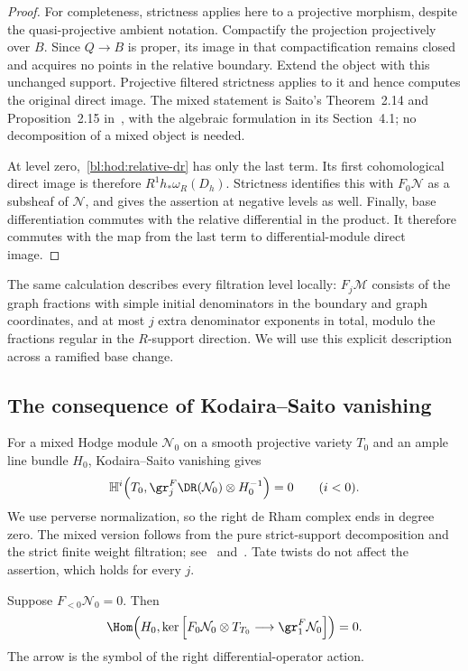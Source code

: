 \begin{proof}
For completeness, strictness applies here to a projective morphism,
despite the quasi-projective ambient notation. Compactify the
projection projectively over $B$. Since $Q\to B$ is proper, its
image in that compactification remains closed and acquires no
points in the relative boundary. Extend the object with this
unchanged support. Projective filtered strictness applies to it
and hence computes the original direct image. The mixed statement
is Saito's Theorem~2.14 and Proposition~2.15
in~\cite{Saito1990}, with the algebraic formulation in its
Section~4.1; no decomposition of a mixed object is needed.

At level zero,~\eqref{bl:hod:relative-dr} has only the last term.
Its first cohomological direct image is therefore
$R^1h_*\omega_R(D_h)$. Strictness identifies this with $F_0\mathcal N$
as a subsheaf of $\mathcal N$, and gives the assertion at negative
levels as well. Finally, base differentiation commutes with the
relative differential in the product. It therefore commutes with
the map from the last term to differential-module direct image.
\end{proof}

The same calculation describes every filtration level locally:
$F_j\mathcal M$ consists of the graph fractions with simple initial
denominators in the boundary and graph coordinates, and at most
$j$ extra denominator exponents in total, modulo the fractions
regular in the $R$-support direction. We will use this explicit
description across a ramified base change.

\subsection{The consequence of Kodaira--Saito vanishing}

For a mixed Hodge module $\mathcal N_0$ on a smooth projective variety
$T_0$ and an ample line bundle $H_0$, Kodaira--Saito vanishing gives
\begin{equation}\label{bl:hod:ksv}
 \mathbb H^i\!\left(T_0,
     \gr_j^F\DR(\mathcal N_0)\otimes H_0^{-1}\right)=0
 \qquad(i<0).
\end{equation}
We use perverse normalization, so the right de Rham complex ends
in degree zero. The mixed version follows from the pure strict-support decomposition
and the strict finite weight filtration; see~\cite[Proposition~2.33]{Saito1990}
and~\cite[Theorem~28]{Popa2016}.
Tate twists do not affect the assertion, which holds for every $j$.

\begin{lemma}
\label{bl:lem:symbol-vanishing}
Suppose $F_{<0}\mathcal N_0=0$. Then
\begin{equation}\label{bl:hod:symbol-vanishing}
 \Hom\!\left(H_0,
  \ker\left[F_0\mathcal N_0\otimes T_{T_0}
                \longrightarrow\gr_1^F\mathcal N_0\right]\right)=0.
\end{equation}
The arrow is the symbol of the right differential-operator action.
\end{lemma}

